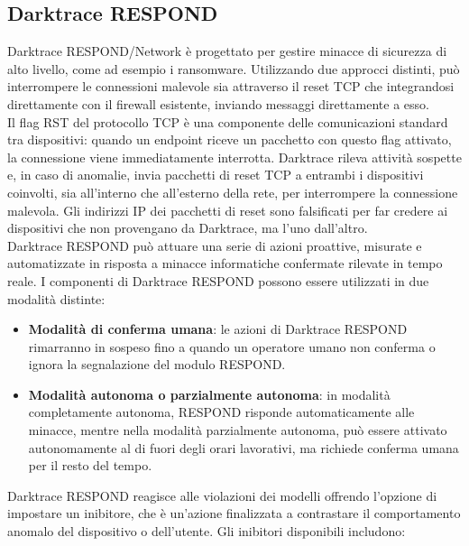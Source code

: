 \subsection{Darktrace RESPOND}
Darktrace RESPOND/Network è progettato per gestire minacce di sicurezza di alto livello, come ad esempio i ransomware. Utilizzando due approcci distinti, può interrompere le connessioni malevole sia attraverso il reset TCP che integrandosi direttamente con il firewall esistente, inviando messaggi direttamente a esso.\\
Il flag RST del protocollo TCP è una componente delle comunicazioni standard tra dispositivi: quando un endpoint riceve un pacchetto con questo flag attivato, la connessione viene immediatamente interrotta. Darktrace rileva attività sospette e, in caso di anomalie, invia pacchetti di reset TCP a entrambi i dispositivi coinvolti, sia all'interno che all'esterno della rete, per interrompere la connessione malevola. Gli indirizzi IP dei pacchetti di reset sono falsificati per far credere ai dispositivi che non provengano da Darktrace, ma l'uno dall'altro.\\
Darktrace RESPOND può attuare una serie di azioni proattive, misurate e automatizzate in risposta a minacce informatiche confermate rilevate in tempo reale. I componenti di Darktrace RESPOND possono essere utilizzati in due modalità distinte:
\begin{itemize}
	\item \textbf{Modalità di conferma umana}: le azioni di Darktrace RESPOND rimarranno in 
	sospeso fino a quando un operatore umano non conferma o ignora 
	la segnalazione del modulo RESPOND.
	\item \textbf{Modalità autonoma o parzialmente autonoma}: in modalità completamente 
	autonoma, RESPOND risponde automaticamente alle minacce, mentre nella modalità 
	parzialmente autonoma, può essere attivato autonomamente al di fuori degli orari 
	lavorativi, ma richiede conferma umana per il resto del tempo.
\end{itemize}
Darktrace RESPOND reagisce alle violazioni dei modelli offrendo l'opzione di impostare 
un inibitore, che è un'azione finalizzata a contrastare il comportamento anomalo del 
dispositivo o dell'utente. Gli inibitori disponibili includono:
